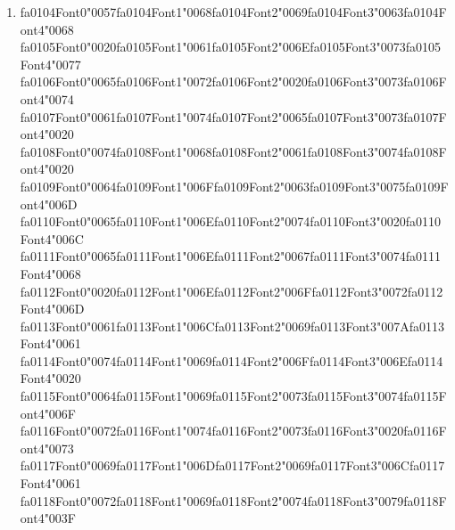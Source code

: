 \documentclass[12pt]{article}
\begin{document}
\begin{enumerate}[label=Q\arabic*.]
 \item {\csname fa0104Font0\endcsname\char"0057}{\csname fa0104Font1\endcsname\char"0068}{\csname fa0104Font2\endcsname\char"0069}{\csname fa0104Font3\endcsname\char"0063}{\csname fa0104Font4\endcsname\char"0068} {\csname fa0105Font0\endcsname\char"0020}{\csname fa0105Font1\endcsname\char"0061}{\csname fa0105Font2\endcsname\char"006E}{\csname fa0105Font3\endcsname\char"0073}{\csname fa0105Font4\endcsname\char"0077} {\csname fa0106Font0\endcsname\char"0065}{\csname fa0106Font1\endcsname\char"0072}{\csname fa0106Font2\endcsname\char"0020}{\csname fa0106Font3\endcsname\char"0073}{\csname fa0106Font4\endcsname\char"0074} {\csname fa0107Font0\endcsname\char"0061}{\csname fa0107Font1\endcsname\char"0074}{\csname fa0107Font2\endcsname\char"0065}{\csname fa0107Font3\endcsname\char"0073}{\csname fa0107Font4\endcsname\char"0020} {\csname fa0108Font0\endcsname\char"0074}{\csname fa0108Font1\endcsname\char"0068}{\csname fa0108Font2\endcsname\char"0061}{\csname fa0108Font3\endcsname\char"0074}{\csname fa0108Font4\endcsname\char"0020} {\csname fa0109Font0\endcsname\char"0064}{\csname fa0109Font1\endcsname\char"006F}{\csname fa0109Font2\endcsname\char"0063}{\csname fa0109Font3\endcsname\char"0075}{\csname fa0109Font4\endcsname\char"006D} {\csname fa0110Font0\endcsname\char"0065}{\csname fa0110Font1\endcsname\char"006E}{\csname fa0110Font2\endcsname\char"0074}{\csname fa0110Font3\endcsname\char"0020}{\csname fa0110Font4\endcsname\char"006C} {\csname fa0111Font0\endcsname\char"0065}{\csname fa0111Font1\endcsname\char"006E}{\csname fa0111Font2\endcsname\char"0067}{\csname fa0111Font3\endcsname\char"0074}{\csname fa0111Font4\endcsname\char"0068} {\csname fa0112Font0\endcsname\char"0020}{\csname fa0112Font1\endcsname\char"006E}{\csname fa0112Font2\endcsname\char"006F}{\csname fa0112Font3\endcsname\char"0072}{\csname fa0112Font4\endcsname\char"006D} {\csname fa0113Font0\endcsname\char"0061}{\csname fa0113Font1\endcsname\char"006C}{\csname fa0113Font2\endcsname\char"0069}{\csname fa0113Font3\endcsname\char"007A}{\csname fa0113Font4\endcsname\char"0061} {\csname fa0114Font0\endcsname\char"0074}{\csname fa0114Font1\endcsname\char"0069}{\csname fa0114Font2\endcsname\char"006F}{\csname fa0114Font3\endcsname\char"006E}{\csname fa0114Font4\endcsname\char"0020} {\csname fa0115Font0\endcsname\char"0064}{\csname fa0115Font1\endcsname\char"0069}{\csname fa0115Font2\endcsname\char"0073}{\csname fa0115Font3\endcsname\char"0074}{\csname fa0115Font4\endcsname\char"006F} {\csname fa0116Font0\endcsname\char"0072}{\csname fa0116Font1\endcsname\char"0074}{\csname fa0116Font2\endcsname\char"0073}{\csname fa0116Font3\endcsname\char"0020}{\csname fa0116Font4\endcsname\char"0073} {\csname fa0117Font0\endcsname\char"0069}{\csname fa0117Font1\endcsname\char"006D}{\csname fa0117Font2\endcsname\char"0069}{\csname fa0117Font3\endcsname\char"006C}{\csname fa0117Font4\endcsname\char"0061} {\csname fa0118Font0\endcsname\char"0072}{\csname fa0118Font1\endcsname\char"0069}{\csname fa0118Font2\endcsname\char"0074}{\csname fa0118Font3\endcsname\char"0079}{\csname fa0118Font4\endcsname\char"003F}

\end{enumerate}
\end{document}
